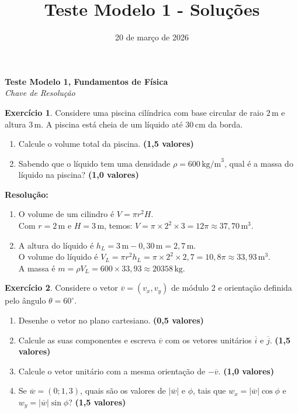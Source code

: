 \documentclass[12pt]{article}
\title{Teste Modelo 1 - Soluções}
\author{}
\date{20 de março de 2026}
\newcommand{\cabecalho}{
	\hfill
	\begin{minipage}[t]{0.7\textwidth}
		\raggedleft
		\textbf{Teste Modelo 1, Fundamentos de Física} \\
		\textit{Chave de Resolução}
	\end{minipage}
}
\newcommand{\pontos}[1]{\hfill\textbf{(#1 valores)}}
\begin{document}
	
	\cabecalho
	
	\vspace{0.5cm}
	
	\textbf{Exercício 1}. Considere uma piscina cilíndrica com base circular de raio $2\,\text{m}$ e altura $3\,\text{m}$. A piscina está cheia de um líquido até $30\,\text{cm}$ da borda.
	\begin{enumerate}[label=\textbf{\alph*)}]
		\item Calcule o volume total da piscina. \pontos{1,5}
		\item Sabendo que o líquido tem uma densidade $\rho = 600\,\text{kg/m}^3$, qual é a massa do líquido na piscina? \pontos{1,0}
	\end{enumerate}
	
	\vspace{0.4cm}
	\textbf{Resolução:}
	\begin{enumerate}[label=\alph*), itemsep=12pt]
		\item O volume de um cilindro é $V = \pi r^2 H$. \\
		Com $r = 2\,\text{m}$ e $H = 3\,\text{m}$, temos: $V = \pi \times 2^2 \times 3 = 12\pi \approx 37,70\,\text{m}^3$.
		
		\item A altura do líquido é $h_L = 3\,\text{m} - 0,30\,\text{m} = 2,7\,\text{m}$. \\
		O volume do líquido é $V_L = \pi r^2 h_L = \pi \times 2^2 \times 2,7 = 10,8\pi \approx 33,93\,\text{m}^3$. \\
		A massa é $m = \rho V_L = 600 \times 33,93 \approx 20358\,\text{kg}$.
	\end{enumerate}
	
	\vspace{0.8cm}
	
	\textbf{Exercício 2}. Considere o vetor $\overline{v} = (v_x, v_y)$ de módulo 2 e orientação definida pelo ângulo $\theta = 60^\circ$.
	\begin{enumerate}[label=\textbf{\alph*)}]
		\item Desenhe o vetor no plano cartesiano. \pontos{0,5}
		\item Calcule as suas componentes e escreva $\overline{v}$ com os vetores unitários $\overline{i}$ e $\overline{j}$. \pontos{1,5}
		\item Calcule o vetor unitário com a mesma orientação de $-\overline{v}$. \pontos{1,0}
		\item Se $\overline{w} = (0; 1,3)$, quais são os valores de $|\overline{w}|$ e $\phi$, tais que $w_x = |\overline{w}| \cos \phi$ e $w_y = |\overline{w}| \sin \phi$? \pontos{1,5}
	\end{enumerate}
	
\end{document}
